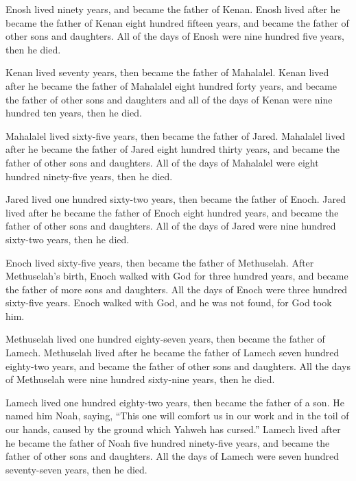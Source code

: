  Enosh lived ninety years, and became the father of Kenan.
 Enosh lived after he became the father of Kenan eight
hundred fifteen years, and became the father of other sons and
daughters.  All of the days of Enosh were nine hundred
five years, then he died.

 Kenan lived seventy years, then became the father of
Mahalalel.  Kenan lived after he became the father of
Mahalalel eight hundred forty years, and became the father of other sons
and daughters  and all of the days of Kenan were nine
hundred ten years, then he died.

 Mahalalel lived sixty-five years, then became the father
of Jared.  Mahalalel lived after he became the father of
Jared eight hundred thirty years, and became the father of other sons
and daughters.  All of the days of Mahalalel were eight
hundred ninety-five years, then he died.

 Jared lived one hundred sixty-two years, then became the
father of Enoch.  Jared lived after he became the father
of Enoch eight hundred years, and became the father of other sons and
daughters.  All of the days of Jared were nine hundred
sixty-two years, then he died.

 Enoch lived sixty-five years, then became the father of
Methuselah.  After Methuselah's birth, Enoch walked with
God for three hundred years, and became the father of more sons and
daughters.  All the days of Enoch were three hundred
sixty-five years.  Enoch walked with God, and he was not
found, for God took him.

 Methuselah lived one hundred eighty-seven years, then
became the father of Lamech.  Methuselah lived after he
became the father of Lamech seven hundred eighty-two years, and became
the father of other sons and daughters.  All the days of
Methuselah were nine hundred sixty-nine years, then he died.

 Lamech lived one hundred eighty-two years, then became
the father of a son.  He named him Noah, saying, ``This
one will comfort us in our work and in the toil of our hands, caused by
the ground which Yahweh has cursed.''  Lamech lived after
he became the father of Noah five hundred ninety-five years, and became
the father of other sons and daughters.  All the days of
Lamech were seven hundred seventy-seven years, then he died.

